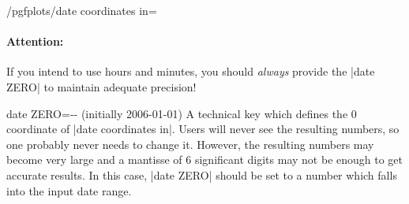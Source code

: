 \begin{stylekey}{/pgfplots/date coordinates in=}
\begin{codeexample}[]
\end{codeexample}

\paragraph{Attention:} If you intend to use hours and minutes, you should \emph{always} provide the |date ZERO| to maintain adequate precision!
\end{stylekey}

\begin{pgfplotskey}{date ZERO=-- (initially 2006-01-01)}
	A technical key which defines the $0$ coordinate of |date coordinates in|. Users will never see the resulting numbers, so one probably never needs to change it. However, the resulting numbers may become very large and a mantisse of 6 significant digits may not be enough to get accurate results. In this case, |date ZERO| should be set to a number which falls into the input date range.
\end{pgfplotskey}
